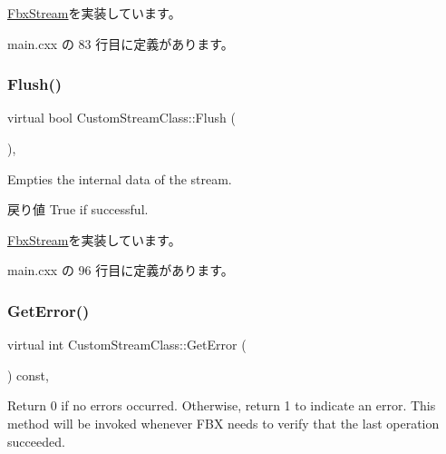 \hyperlink{class_fbx_stream_a6779ab0ccbe8e14e5cf5cf47f5206519}{Fbx\+Stream}を実装しています。



 main.\+cxx の 83 行目に定義があります。

\mbox{\label{class_custom_stream_class_a4b5d2980af50604d2cb5ec900ef8488a}} 
\subsubsection{\texorpdfstring{Flush()}{Flush()}}
{\footnotesize\ttfamily virtual bool Custom\+Stream\+Class\+::\+Flush (\begin{DoxyParamCaption}{ }\end{DoxyParamCaption})\hspace{0.3cm}{\ttfamily [inline]}, {\ttfamily [virtual]}}

Empties the internal data of the stream. \begin{DoxyReturn}{戻り値}
True if successful. 
\end{DoxyReturn}


\hyperlink{class_fbx_stream_a9174d1c9a10e7f0f6f283c6b7f9a1dce}{Fbx\+Stream}を実装しています。



 main.\+cxx の 96 行目に定義があります。

\mbox{\label{class_custom_stream_class_a127e5bdb249b98bf93fb50b3731747a6}} 
\subsubsection{\texorpdfstring{Get\+Error()}{GetError()}}
{\footnotesize\ttfamily virtual int Custom\+Stream\+Class\+::\+Get\+Error (\begin{DoxyParamCaption}{ }\end{DoxyParamCaption}) const\hspace{0.3cm}{\ttfamily [inline]}, {\ttfamily [virtual]}}

Return 0 if no errors occurred. Otherwise, return 1 to indicate an error. This method will be invoked whenever F\+BX needs to verify that the last operation succeeded. 

